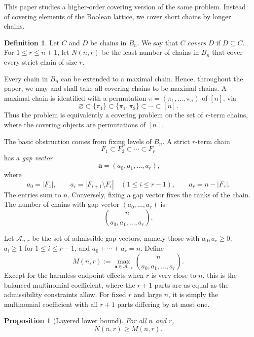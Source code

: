 \documentclass[11pt]{article}
\newtheorem{proposition}[theorem]{Proposition}
\theoremstyle{definition}
\newtheorem{definition}[theorem]{Definition}
\theoremstyle{remark}
\begin{document}
This paper studies a higher-order covering version of the same problem.  Instead of covering elements of the Boolean lattice, we cover short chains by longer chains.

\begin{definition}
Let $C$ and $D$ be chains in $B_n$.  We say that $C$ \emph{covers} $D$ if $D\subseteq C$.  For $1\le r\le n+1$, let $N(n,r)$ be the least number of chains in $B_n$ that cover every strict chain of size $r$.
\end{definition}

Every chain in $B_n$ can be extended to a maximal chain.  Hence, throughout the paper, we may and shall take all covering chains to be maximal chains.  A maximal chain is identified with a permutation $\pi=(\pi_1,\ldots,\pi_n)$ of $[n]$, via
\[
   \varnothing
   \subset \{\pi_1\}
   \subset \{\pi_1,\pi_2\}
   \subset \cdots
   \subset [n].
\]
Thus the problem is equivalently a covering problem on the set of $r$-term chains, where the covering objects are permutations of $[n]$.




The basic obstruction comes from fixing levels of $B_n$.  A strict $r$-term chain
\[
   F_1\subset F_2\subset\cdots\subset F_r
\]
has a \emph{gap vector}
\[
 \textbf{ a}= (a_0,a_1,\ldots,a_r),
\]
where
\[
   a_0=|F_1|,\qquad
   a_i=|F_{i+1}\setminus F_i|\quad (1\le i\le r-1),\qquad
   a_r=n-|F_r|.
\]
The entries sum to $n$.  Conversely, fixing a gap vector fixes the ranks of the chain.  The number of chains with gap vector $(a_0,\ldots,a_r)$ is
\[
   \binom{n}{a_0,a_1,\ldots,a_r}.
\]

Let $\mathcal A_{n,r}$ be the set of admissible gap vectors, namely those with $a_0,a_r\ge0$, $a_i\ge1$ for $1\le i\le r-1$, and $a_0+\cdots+a_r=n$.  Define
\[
   M(n,r):=\max_{\mathbf a\in\mathcal A_{n,r}}\binom{n}{a_0,a_1,\ldots,a_r}.
\]
Except for the harmless endpoint effects when $r$ is very close to $n$, this is the balanced multinomial coefficient, where the $r+1$ parts are as equal as the admissibility constraints allow.  For fixed $r$ and large $n$, it is simply the multinomial coefficient with all $r+1$ parts differing by at most one.

\begin{proposition}[Layered lower bound]\label{prop:layered-lower}
For all $n$ and $r$,
\[
   N(n,r)\ge M(n,r).
\]
\end{proposition}
\end{document}
